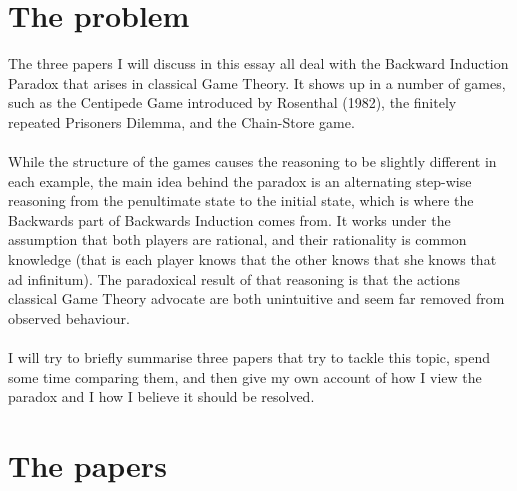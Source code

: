 \documentclass{article}
\begin{document}
\section{The problem}
The three papers I will discuss in this essay all deal with the Backward Induction Paradox that arises in classical Game Theory. It shows up in a number of games, such as the Centipede Game introduced by Rosenthal (1982), the finitely repeated Prisoners Dilemma, and the Chain-Store game.
\\
\\
While the structure of the games causes the reasoning to be slightly different in each example, the main idea behind the paradox is an alternating step-wise reasoning from the penultimate state to the initial state, which is where the Backwards part of Backwards Induction comes from. It works under the assumption that both players are rational, and their rationality is common knowledge (that is each player knows that the other knows that she knows that ad infinitum). The paradoxical result of that reasoning is that the actions classical Game Theory advocate are both unintuitive and seem far removed from observed behaviour.
\\
\\
I will try to briefly summarise three papers that try to tackle this topic, spend some time comparing them, and then give my own account of how I view the paradox and I how I believe it should be resolved. 





















\section{The papers}
\end{document}
